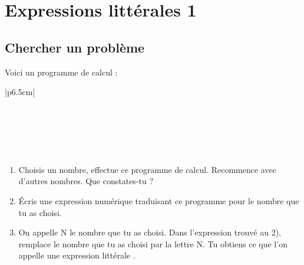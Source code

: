 \documentclass[a4paper,10pt]{report}
\begin{document}
\newpage
\setcounter{chapter}{6}
\chapter{Expressions littérales 1}

\vspace{-1mm}
\section{Chercher un problème}

\vspace{-3mm}
\begin{ex}

\noindent \begin{minipage}{6.5cm}

Voici un programme de calcul :

\medskip
{}
\renewcommand{\arraystretch}{0.1}
\begin{tabular}{|p{6.5cm}|}
\hline
\vspace{2mm}  \\ 
\vspace{2mm}  \\ 
\vspace{2mm}  \\ 
\vspace{2mm}  \\ 
\vspace{2mm}  \\
\vspace{2mm} \\
\hline
\end{tabular}
\end{minipage}
\hspace{3mm}
\begin{minipage}{9.8cm}
\begin{enumerate}
\item Choisis un nombre, effectue ce programme de calcul.
Recommence avec d'autres nombres. Que constates-tu ?
\item Écris une expression numérique traduisant ce programme pour le nombre que tu as choisi.
\item On appelle N le nombre que tu as choisi. Dans l'expression trouvé au 2), remplace le nombre que tu as choisi par la lettre N.
Tu obtiens ce que l'on appelle \og une expression littérale \fg{}.
\end{enumerate}
\end{minipage}

\medskip
\noindent\grandscarreaux{\linewidth}{3.2cm}
\end{ex}
\end{document}
